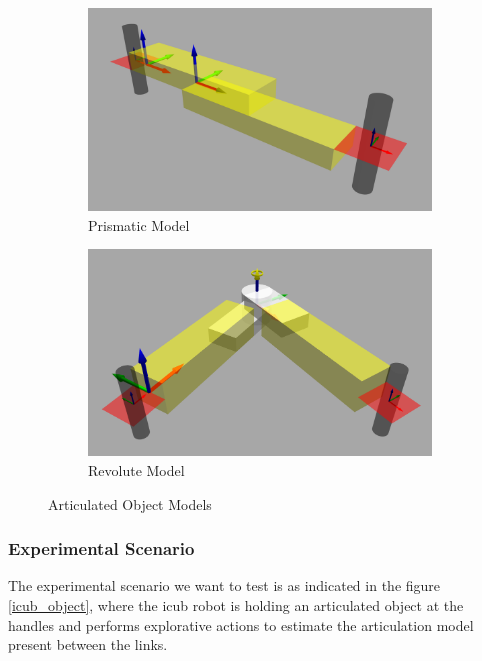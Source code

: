 \documentclass[12pt,a4paper]{report}
\begin{document}
\begin{figure}[H]
	\begin{subfigure}[b]{0.5\textwidth}
		\centering
		\includegraphics[scale=0.15]{figures/1p_2link.png}
		\caption{Prismatic Model}
		\label{pmodel}
	\end{subfigure}
	\begin{subfigure}[b]{0.5\textwidth}
		\centering
		\includegraphics[scale=0.16]{figures/1r_2link.png}
		\caption{Revolute Model}
		\label{rmodel}
	\end{subfigure}
	\caption{Articulated Object Models}
	\label{objects}
\end{figure}

\subsubsection{Experimental Scenario}
The experimental scenario we want to test is as indicated in the figure \ref{icub_object}, where the icub robot is holding an articulated object at the handles and performs explorative actions to estimate the
articulation model present between the links.
\end{document}
